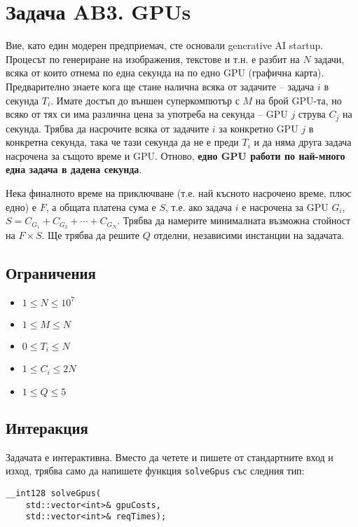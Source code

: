\documentclass[12pt]{article}
\begin{document}
	
\section{Задача AB3. GPUs}

Вие, като един модерен предприемач, сте основали generative AI startup. Процесът по генериране на изображения, текстове и т.н. е разбит на $N$ задачи, всяка от които отнема по една секунда на по едно GPU (графична карта). Предварително знаете кога ще стане налична всяка от задачите -- задача $i$ в секунда $T_i$. Имате достъп до външен суперкомпютър с $M$ на брой GPU-та, но всяко от тях си има различна цена за употреба на секунда -- GPU $j$ струва $C_j$ на секунда. Трябва да насрочите всяка от задачите $i$ за конкретно GPU $j$ в конкретна секунда, така че тази секунда да не е преди $T_i$ и да няма друга задача насрочена за същото време и GPU. Отново, \textbf{едно GPU работи по най-много една задача в дадена секунда}.

Нека финалното време на приключване (т.е. най късното насрочено време, плюс едно) е $F$, а общата платена сума е $S$, т.е. ако задача $i$ е насрочена за GPU $G_i$, $S = C_{G_1} + C_{G_2} + \dotsb + C_{G_N}$. Трябва да намерите минималната възможна стойност на $F \times S$. Ще трябва да решите $Q$ отделни, независими инстанции на задачата.

\subsection{Ограничения}
\vspace{0.1em}
\begin{itemize}
    \item $1 \leq N \leq 10^7$
    \item $1 \leq M \leq N$
    \item $0 \leq T_i \leq N$
    \item $1 \leq C_i \leq 2N$
    \item $1 \leq Q \leq 5$
\end{itemize}

\subsection{Интеракция}

Задачата е интерактивна. Вместо да четете и пишете от стандартните вход и изход, трябва само да напишете функция \verb|solveGpus| със следния тип:

\begin{verbatim}
__int128 solveGpus(
    std::vector<int>& gpuCosts,
    std::vector<int>& reqTimes);
\end{verbatim}
\end{document}
